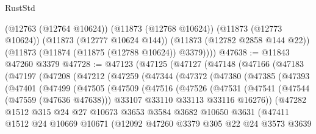 \begin{lexlean}{RustStd}
\begin{coremodule}
        (@12763 (@12764 @10624))
        (@11873 (@12768 @10624))
        (@11873 (@12773 @10624))
        (@11873 (@12777 @10624 @144))
        (@11873 (@12782 @2858 @144 @22))
        (@11873 (@11874 (@11875 (@12788 @10624)) @3379))))
@47638 := @11843 @47260 @3379
@47728 := @47123
    (@47125
      (@47127
        (@47148
          (@47166
            (@47183
              (@47197
                (@47208
                  (@47212
                    (@47259
                      (@47344
                        (@47372
                          (@47380
                            (@47385
                              (@47393
                                (@47401
                                  (@47499
                                    (@47505
                                      (@47509
                                        (@47516
                                          (@47526
                                            (@47531
                                              (@47541
                                                (@47544 (@47559 (@47636 @47638)))
                                                @33107
                                                @33110
                                                @33113
                                                @33116
                                                @16276))
                                            (@47282
                                              @1512
                                              @315
                                              @24
                                              @27
                                              @10673
                                              @3653
                                              @3584
                                              @3682
                                              @10650
                                              @3631
                                              (@47411
                                                @1512
                                                @24
                                                @10669
                                                @10671
                                                (@12092
                                                  @47260
                                                  @3379
                                                  @305
                                                  @22
                                                  @24
                                                  @3573
                                                  @3639

\end{coremodule}
\end{lexlean}
